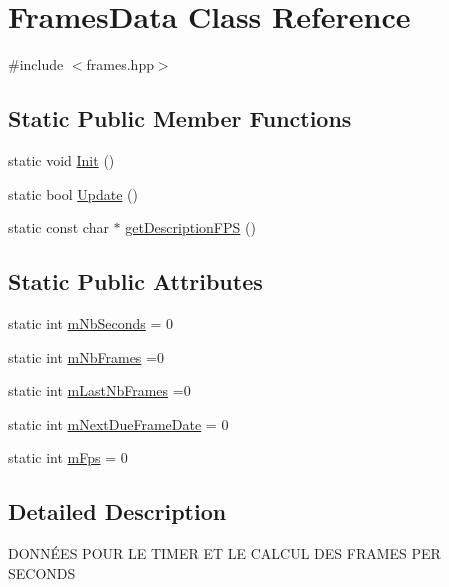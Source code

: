 \hypertarget{class_frames_data}{}\section{Frames\+Data Class Reference}
\label{class_frames_data}


{\ttfamily \#include $<$frames.\+hpp$>$}

\subsection*{Static Public Member Functions}
\begin{DoxyCompactItemize}
\item 
static void \hyperlink{class_frames_data_adb376443cd35cdf789334e5216799632}{Init} ()
\item 
static bool \hyperlink{class_frames_data_a0a13292d2ffde616533d2185de424af1}{Update} ()
\item 
static const char $\ast$ \hyperlink{class_frames_data_a2e4c0df27e34dd492dae0b3c674838aa}{get\+Description\+F\+PS} ()
\end{DoxyCompactItemize}
\subsection*{Static Public Attributes}
\begin{DoxyCompactItemize}
\item 
static int \hyperlink{class_frames_data_a56de1cc7ef9d170fe22887138d8addbf}{m\+Nb\+Seconds} = 0
\item 
static int \hyperlink{class_frames_data_a10cfddde5c0b9b229af867f2ed7af153}{m\+Nb\+Frames} =0
\item 
static int \hyperlink{class_frames_data_ad0b7497c5a449779d7dd01de39f592d0}{m\+Last\+Nb\+Frames} =0
\item 
static int \hyperlink{class_frames_data_ac0c60108ce1672499d5d69d9c8ea9111}{m\+Next\+Due\+Frame\+Date} = 0
\item 
static int \hyperlink{class_frames_data_a6a6d7c603d09b1ba203e72a82d499eae}{m\+Fps} = 0
\end{DoxyCompactItemize}


\subsection{Detailed Description}
D\+O\+N\+NÉ\+ES P\+O\+UR LE T\+I\+M\+ER ET LE C\+A\+L\+C\+UL D\+ES F\+R\+A\+M\+ES P\+ER S\+E\+C\+O\+N\+DS 

